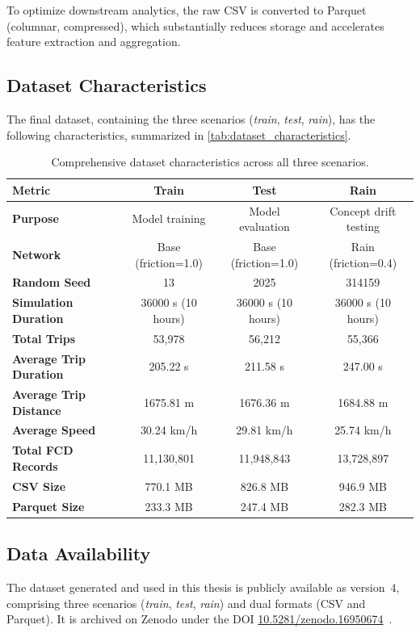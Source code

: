To optimize downstream analytics, the raw CSV is converted to Parquet (columnar, compressed), which substantially reduces storage and accelerates feature extraction and aggregation.

\subsection{Dataset Characteristics}
The final dataset, containing the three scenarios (\emph{train}, \emph{test}, \emph{rain}), has the following characteristics, summarized in \autoref{tab:dataset_characteristics}.

\begin{table}[t]
    \centering
    \caption{Comprehensive dataset characteristics across all three scenarios.}
    \label{tab:dataset_characteristics}
    \vspace{0.5em}
    \begin{tabular}{lccc}
        \toprule
        \textbf{Metric} & \textbf{Train} & \textbf{Test} & \textbf{Rain} \\
        \midrule
        \textbf{Purpose} & Model training & Model evaluation & Concept drift testing \\
        \textbf{Network} & Base (friction=1.0) & Base (friction=1.0) & Rain (friction=0.4) \\
        \textbf{Random Seed} & 13 & 2025 & 314159 \\
        \textbf{Simulation Duration} & 36000 s (10 hours) & 36000 s (10 hours) & 36000 s (10 hours) \\
        \textbf{Total Trips} & 53,978 & 56,212 & 55,366 \\
        \textbf{Average Trip Duration} & 205.22 s & 211.58 s & 247.00 s \\
        \textbf{Average Trip Distance} & 1675.81 m & 1676.36 m & 1684.88 m \\
        \textbf{Average Speed} & 30.24 km/h & 29.81 km/h & 25.74 km/h \\
        \textbf{Total FCD Records} & 11,130,801 & 11,948,843 & 13,728,897 \\
        \textbf{CSV Size} & 770.1 MB & 826.8 MB & 946.9 MB \\
        \textbf{Parquet Size} & 233.3 MB & 247.4 MB & 282.3 MB \\
        \bottomrule
    \end{tabular}
\end{table}

\subsection{Data Availability}
\label{subsec:data_availability}
The dataset generated and used in this thesis is publicly available as version~4, comprising three scenarios (\emph{train}, \emph{test}, \emph{rain}) and dual formats (CSV and Parquet). It is archived on Zenodo under the DOI \href{https://doi.org/10.5281/zenodo.16950674}{10.5281/zenodo.16950674}~\cite{kyriakopoulos2025synthetic}.

